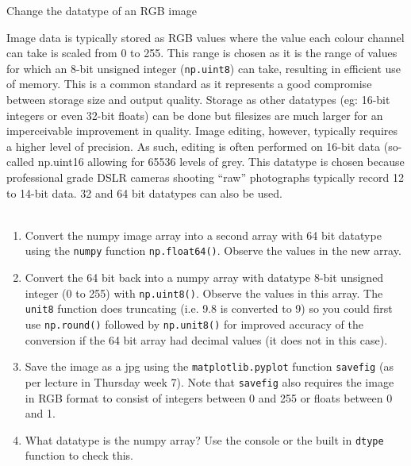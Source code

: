 \documentclass{lab}
\begin{document}
\begin{task}{Change the datatype of an RGB image}{}

Image data is typically stored as RGB values where the value each colour channel can take is scaled from 0 to 255. This range is chosen as it is the range of values for which an 8-bit unsigned integer (\texttt{np.uint8}) can take, resulting in eﬃcient use of memory. This is a common standard as it represents a good compromise between storage size and output quality. Storage as other datatypes (eg: 16-bit integers or even 32-bit ﬂoats) can be done but ﬁlesizes are much larger for an imperceivable improvement in quality.
Image editing, however, typically requires a higher level of precision. As such, editing is often performed on 16-bit data (so-called np.uint16 allowing for 65536 levels of grey. This datatype is chosen because professional grade DSLR cameras shooting “raw” photographs typically record 12 to 14-bit data. 32 and 64 bit datatypes can also be used. \\~

\begin{enumerate}
\item Convert the numpy image array into a second array with 64 bit datatype using the \texttt{numpy} function \texttt{np.float64()}. Observe the values in the new array.
\item Convert the 64 bit back into a numpy array with datatype 8-bit unsigned integer (0 to 255) with \texttt{np.uint8()}. Observe the values in this array. The \texttt{unit8} function does truncating (i.e. 9.8 is converted to 9) so you could first use \texttt{np.round()} followed by \texttt{np.unit8()} for improved accuracy of the conversion if the 64 bit array had decimal values (it does not in this case).
\item Save the image as a jpg using the \texttt{matplotlib.pyplot} function \texttt{savefig} (as per lecture in Thursday week 7). Note that \texttt{savefig} also requires the image in RGB format to consist of integers between 0 and 255 or floats between 0 and 1. 
\item 	What datatype is the numpy array? Use the console or the built in \texttt{dtype} function to check this.
\end{enumerate}

\end{task}
\end{document}
